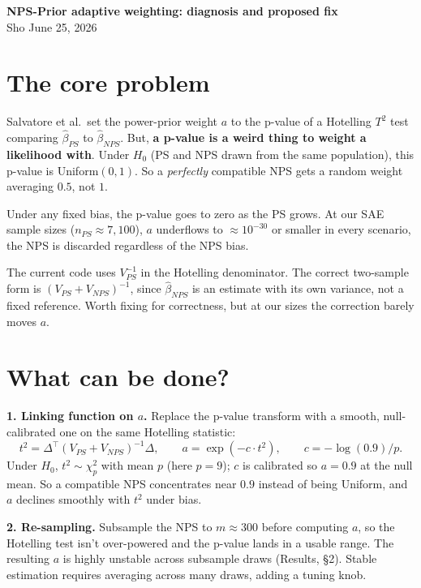 \documentclass[11pt]{article}
\begin{document}
\begin{center}
{\Large\bfseries NPS-Prior adaptive weighting: diagnosis and proposed fix}\\[0.3em]
{\normalsize Sho \quad\textbar\quad June 25, 2026}
\end{center}
\vspace{0.5em}

\section*{The core problem}

Salvatore et al.\ set the power-prior weight $a$ to the p-value of a Hotelling $T^2$ test comparing $\hat\beta_{PS}$ to $\hat\beta_{NPS}$. But, \textbf{a p-value is a weird thing to weight a likelihood with}.  Under $H_0$ (PS and NPS drawn from the same population), this p-value is Uniform$(0,1)$. So a \textit{perfectly} compatible NPS gets a random weight averaging $0.5$, not $1$.

Under any fixed bias, the p-value goes to zero as the PS grows. At our SAE sample sizes ($n_{PS} \approx 7{,}100$), $a$ underflows to $\approx 10^{-30}$ or smaller in every scenario, the NPS is discarded regardless of the NPS bias.

The current code uses $V_{PS}^{-1}$ in the Hotelling denominator. The correct two-sample form is $(V_{PS} + V_{NPS})^{-1}$, since $\hat\beta_{NPS}$ is an estimate with its own variance, not a fixed reference. Worth fixing for correctness, but at our sizes the correction barely moves $a$.

\section*{What can be done?}

\textbf{1. Linking function on $a$.} Replace the p-value transform with a smooth, null-calibrated one on the same Hotelling statistic:
$$
t^2 = \Delta^\top (V_{PS} + V_{NPS})^{-1} \Delta, \qquad a = \exp(-c \cdot t^2), \qquad c = -\log(0.9)/p.
$$
Under $H_0$, $t^2 \sim \chi^2_p$ with mean $p$ (here $p = 9$); $c$ is calibrated so $a = 0.9$ at the null mean. So a compatible NPS concentrates near $0.9$ instead of being Uniform, and $a$ declines smoothly with $t^2$ under bias.

\textbf{2. Re-sampling.} Subsample the NPS to $m \approx 300$ before computing $a$, so the Hotelling test isn't over-powered and the p-value lands in a usable range. The resulting $a$ is highly unstable across subsample draws (Results, §2). Stable estimation requires averaging across many draws, adding a tuning knob.
\end{document}
